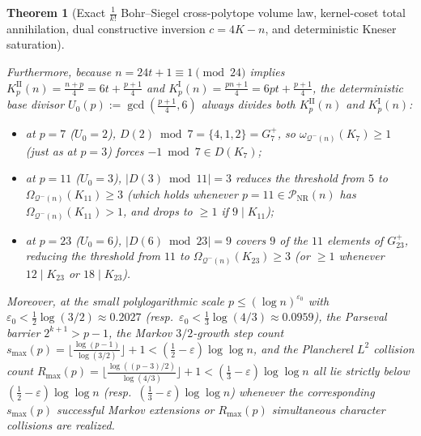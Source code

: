 \documentclass[11pt, a4paper]{article}
\theoremstyle{plain}
\newtheorem{theorem}{Theorem}[section]
\theoremstyle{definition}
\begin{document}
\begin{theorem}[Exact $\frac{1}{k!}$ Bohr--Siegel cross-polytope volume law, kernel-coset total annihilation, dual constructive inversion $c=4K-n$, and deterministic Kneser saturation]
\begin{enumerate}[(a)]
    Furthermore, because $n=24t+1\equiv1\pmod{24}$ implies $K_p^{\mathrm{II}}(n)=\frac{n+p}{4}=6t+\frac{p+1}{4}$ and $K_p^{\mathrm{I}}(n)=\frac{pn+1}{4}=6pt+\frac{p+1}{4}$, the deterministic base divisor $U_0(p):=\gcd(\frac{p+1}{4},6)$ always divides both $K_p^{\mathrm{II}}(n)$ and $K_p^{\mathrm{I}}(n)$:
    \begin{itemize}
        \item at $p=7$ ($U_0=2$), $D(2)\bmod 7=\{4,1,2\}=G_7^{+}$, so $\omega_{\mathcal{Q}^{-}(n)}(K_7)\ge1$ (just as at $p=3$) forces $-1\bmod 7\in D(K_7)$;
        \item at $p=11$ ($U_0=3$), $|D(3)\bmod 11|=3$ reduces the threshold from $5$ to $\Omega_{\mathcal{Q}^{-}(n)}(K_{11})\ge3$ (which holds whenever $p=11\in\mathcal{P}_{\mathrm{NR}}(n)$ has $\Omega_{\mathcal{Q}^{-}(n)}(K_{11})>1$, and drops to $\ge1$ if $9\mid K_{11}$);
        \item at $p=23$ ($U_0=6$), $|D(6)\bmod 23|=9$ covers $9$ of the $11$ elements of $G_{23}^{+}$, reducing the threshold from $11$ to $\Omega_{\mathcal{Q}^{-}(n)}(K_{23})\ge3$ (or $\ge1$ whenever $12\mid K_{23}$ or $18\mid K_{23}$).
    \end{itemize}
    Moreover, at the small polylogarithmic scale $p\le(\log n)^{\varepsilon_0}$ with $\varepsilon_0<\frac12\log(3/2)\approx 0.2027$ (resp.\ $\varepsilon_0<\frac13\log(4/3)\approx 0.0959$), the Parseval barrier $2^{k+1}>p-1$, the Markov $3/2$-growth step count $s_{\max}(p)=\lfloor\frac{\log(p-1)}{\log(3/2)}\rfloor+1<(\frac12-\varepsilon)\log\log n$, and the Plancherel $L^{2}$ collision count $R_{\max}(p)=\lfloor\frac{\log((p-3)/2)}{\log(4/3)}\rfloor+1<(\frac13-\varepsilon)\log\log n$ all lie strictly below $(\frac12-\varepsilon)\log\log n$ (resp.\ $(\frac13-\varepsilon)\log\log n$) whenever the corresponding $s_{\max}(p)$ successful Markov extensions or $R_{\max}(p)$ simultaneous character collisions are realized.


\end{enumerate}
\end{theorem}
\end{document}
